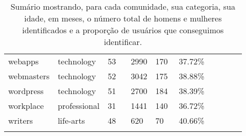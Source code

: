 \begin{longtabu}{@{}
	p{0.17\linewidth}
	p{0.2\linewidth}
	P{0.1\linewidth}
	P{0.1\linewidth}
	P{0.1\linewidth}
	P{0.1\linewidth}
	p{0.15\linewidth}@{}}
webapps          & technology         & 53    & 2990             & 170     & 37.72\%     \\
webmasters       & technology         & 52    & 3042             & 175     & 38.88\%     \\
wordpress        & technology         & 51    & 2700             & 184     & 38.39\%     \\
workplace        & professional       & 31    & 1441             & 140     & 36.72\%     \\
writers          & life-arts          & 48    & 620              & 70      & 40.66\%  \\ \bottomrule

\caption[Sumário dos usuários identificados]{Sumário mostrando, para cada comunidade, sua categoria, sua idade, em meses, o número total de homens e mulheres identificados e a proporção de usuários que conseguimos identificar.}
\end{longtabu}
